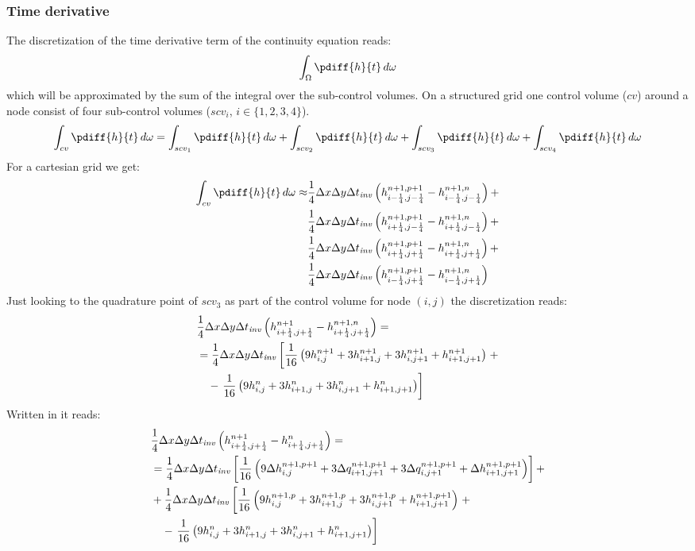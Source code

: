 \subsubsection{Time derivative}
The discretization of the time derivative term of the continuity equation reads:
\begin{align}
    \int_{\Omega} \pdiff{h}{t}\, d\omega
\end{align}
which will be approximated by the sum of the integral over the sub-control volumes.
On a structured grid one control volume ($cv$) around a node consist of four sub-control volumes ($scv_i$, $i\in\{1,2,3,4\}$).
\begin{align}
    \int_{cv} \pdiff{h}{t}\, d\omega =
    \int_{scv_1} \pdiff{h}{t}\, d\omega +
    \int_{scv_2} \pdiff{h}{t}\, d\omega +
    \int_{scv_3} \pdiff{h}{t}\, d\omega +
    \int_{scv_4} \pdiff{h}{t}\, d\omega
\end{align}
For a cartesian grid we get:
\begin{align}
    \int_{cv} \pdiff{h}{t}\, d\omega \approx &
    \quart\Dx\Dy\Dtinv \left( h^{n+1,p+1}_{i-\quart, j-\quart} -  h^{n+1,n}_{i-\quart, j-\quart} \right) +
    \nonumber \\*
    &\quart\Dx\Dy\Dtinv \left( h^{n+1,p+1}_{i+\quart, j-\quart} -  h^{n+1,n}_{i+\quart, j-\quart} \right) +
    \nonumber \\*
    &\quart\Dx\Dy\Dtinv \left( h^{n+1,p+1}_{i+\quart, j+\quart} -  h^{n+1,n}_{i+\quart, j+\quart} \right) +
    \nonumber \\*
    &\quart\Dx\Dy\Dtinv \left( h^{n+1,p+1}_{i-\quart, j+\quart} -  h^{n+1,n}_{i-\quart, j+\quart} \right)
\end{align}
Just looking to the quadrature point of $scv_3$ as part of the control volume for node $(i,j)$ the discretization reads:
\begin{align}
    &\frac{1}{4}\Delta x\Delta y\Delta t_{\it{inv}} \left( h^{n+1}_{i+\frac{1}{4}, j+\frac{1}{4}} -  h^{n+1,n}_{i+\frac{1}{4}, j+\frac{1}{4}} \right) =
    \\*
    &= \frac{1}{4}\Delta x\Delta y\Delta t_{\it{inv}} \left[ \frac{1}{16}\left( 9h^{n+1}_{i, j} + 3 h^{n+1}_{i+1,j}  + 3  h^{n+1}_{i, j+1} + h^{n+1}_{i+1, j+1}\right) \right. +
    \\*
    &\quad - \left. \frac{1}{16}\left( 9 h^{n}_{i, j} +  3 h^{n}_{i+1,j}  + 3  h^{n}_{i, j+1} + h^{n}_{i+1, j+1}\right)\right]
\end{align}
Written in \deltaformulation  it reads:
\begin{align}
    &\frac{1}{4}\Delta x\Delta y\Delta t_{\it{inv}} \left( h^{n+1}_{i+\frac{1}{4}, j+\frac{1}{4}} -  h^{n}_{i+\frac{1}{4}, j+\frac{1}{4}} \right) =
    \nonumber \\*
    &=\frac{1}{4}\Delta x\Delta y\Delta t_{\it{inv}} \left[ \frac{1}{16}\left( 9 \Delta h^{n+1,p+1}_{i, j} + 3 \Delta q^{n+1,p+1}_{i+1,j+1}  + 3 \Delta q^{n+1,p+1}_{i, j+1} + \Delta h^{n+1,p+1}_{i+1, j+1}\right) \right] +
    \nonumber \\*
    & + \frac{1}{4}\Delta x\Delta y\Delta t_{\it{inv}} \left[ \frac{1}{16}\left( 9 h^{n+1,p}_{i, j} + 3 h^{n+1,p}_{i+1,j}  + 3 h^{n+1,p}_{i, j+1} + h^{n+1,p+1}_{i+1, j+1}\right) \right. +
    \nonumber \\*
    &\quad - \left. \frac{1}{16}\left( 9h^{n}_{i, j} +  3 h^{n}_{i+1,j}  + 3  h^{n}_{i, j+1} + h^{n}_{i+1, j+1}\right)\right]
\end{align}

